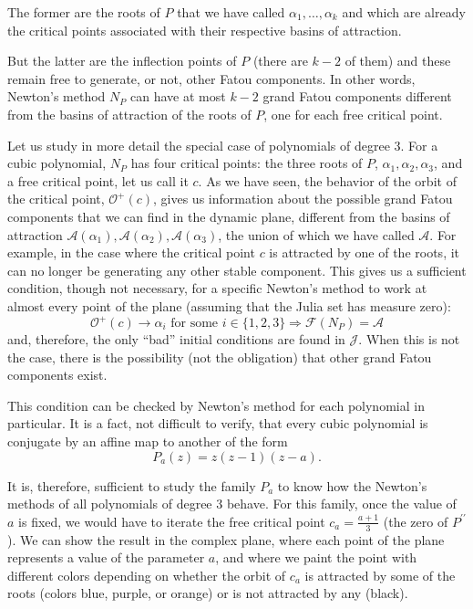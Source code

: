 \documentclass[12pt, a4paper]{article}
\begin{document}
The former are the roots of $P$ that we have called $\alpha_{1}, \dots,
\alpha_{k}$ and which are already the critical points associated with their
respective basins of attraction.

But the latter are the inflection points of $P$ (there are $k-2$ of them) and
these remain free to generate, or not, other Fatou components. In other words,
Newton's method $N_{P}$ can have at most $k-2$ grand Fatou components different
from the basins of attraction of the roots of $P$, one for each free critical
point.

Let us study in more detail the special case of polynomials of degree 3. For a
cubic polynomial, $N_{P}$ has four critical points: the three roots of $P$,
$\alpha_{1}, \alpha_{2}, \alpha_{3}$, and a free critical point, let us call it
$c$. As we have seen, the behavior of the orbit of the critical point,
$\mathcal{O}^{+}(c)$, gives us information about the possible grand Fatou
components that we can find in the dynamic plane, different from the basins of
attraction $\mathcal{A}(\alpha_{1}), \mathcal{A}(\alpha_{2}),
\mathcal{A}(\alpha_{3})$, the union of which we have called $\mathcal{A}$. For
example, in the case where the critical point $c$ is attracted by one of the
roots, it can no longer be generating any other stable component. This gives us
a sufficient condition, though not necessary, for a specific Newton's method to
work at almost every point of the plane (assuming that the Julia set has measure
zero):
\begin{equation*}
    \mathcal{O}^{+}(c)\rightarrow \alpha_{i} \text{ for some } i\in\{1,2,3\} \Rightarrow \mathcal{F}(N_{P})=\mathcal{A}
\end{equation*}
and, therefore, the only ``bad'' initial conditions are found in $\mathcal{J}$.
When this is not the case, there is the possibility (not the obligation) that
other grand Fatou components exist.

This condition can be checked by Newton's method for each polynomial in
particular. It is a fact, not difficult to verify, that every cubic polynomial
is conjugate by an affine map to another of the form
\begin{equation*}
    P_{a}(z)=z(z-1)(z-a).
\end{equation*}

It is, therefore, sufficient to study the family $P_{a}$ to know how the
Newton's methods of all polynomials of degree 3 behave. For this family, once
the value of $a$ is fixed, we would have to iterate the free critical point
$c_{a}=\frac{a+1}{3}$ (the zero of $P^{\prime\prime}$). We can show the result
in the complex plane, where each point of the plane represents a value of the
parameter $a$, and where we paint the point with different colors depending on
whether the orbit of $c_{a}$ is attracted by some of the roots (colors blue,
purple, or orange) or is not attracted by any (black).
\end{document}
